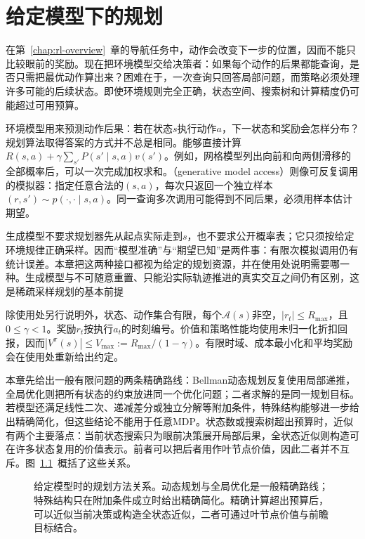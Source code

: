 \chapter{给定模型下的规划}
\label{chap:rl-planning}

在第~\ref{chap:rl-overview}~章的导航任务中，动作会改变下一步的位置，因而不能只比较眼前的奖励。现在把环境模型交给决策者：如果每个动作的后果都能查询，是否只需把最优动作算出来？困难在于，一次查询只回答局部问题，而策略必须处理许多可能的后续状态。即使环境规则完全正确，状态空间、搜索树和计算精度仍可能超过可用预算。

环境模型用来预测动作后果：若在状态$s$执行动作$a$，下一状态和奖励会怎样分布？规划算法取得答案的方式并不总是相同。能够直接计算
$R(s,a)+\gamma\sum_{s'}P(s'\mid s,a)v(s')$。例如，网格模型列出向前和向两侧滑移的全部概率后，可以一次完成加权求和。（generative model access）则像可反复调用的模拟器：指定任意合法的$(s,a)$，每次只返回一个独立样本$(r,s')\sim p(\cdot,\cdot\mid s,a)$。同一查询多次调用可能得到不同后果，必须用样本估计期望。

生成模型不要求规划器先从起点实际走到$s$，也不要求公开概率表；它只须按给定环境规律正确采样。因而“模型准确”与“期望已知”是两件事：有限次模拟调用仍有统计误差。本章把这两种接口都视为给定的规划资源，并在使用处说明需要哪一种。生成模型与不可随意重置、只能沿实际轨迹推进的真实交互之间仍有区别，这是稀疏采样规划的基本前提

除使用处另行说明外，状态、动作集合有限，每个$\mathcal A(s)$非空，$|r_t|\leq R_{\max}$，且$0\leq\gamma<1$。奖励$r_t$按执行$a_t$的时刻编号。价值和策略性能均使用未归一化折扣回报，因而$|V^\pi(s)|\leq V_{\max}:=R_{\max}/(1-\gamma)$。有限时域、成本最小化和平均奖励会在使用处重新给出约定。

本章先给出一般有限问题的两条精确路线：Bellman动态规划反复使用局部递推，全局优化则把所有状态的约束放进同一个优化问题；二者求解的是同一规划目标。若模型还满足线性二次、递减差分或独立分解等附加条件，特殊结构能够进一步给出精确简化，但这些结论不能用于任意MDP。状态数或搜索树超出预算时，近似有两个主要落点：当前状态搜索只为眼前决策展开局部后果，全状态近似则构造可在许多状态复用的价值表示。前者可以把后者用作叶节点价值，因此二者并不互斥。图~\ref{fig:rl-planning-map}~概括了这些关系。

\begin{figure}[htbp]
  \centering
  
  \caption{给定模型时的规划方法关系。动态规划与全局优化是一般精确路线；特殊结构只在附加条件成立时给出精确简化。精确计算超出预算后，可以近似当前决策或构造全状态近似，二者可通过叶节点价值与前瞻目标结合。}
  \label{fig:rl-planning-map}
\end{figure}

